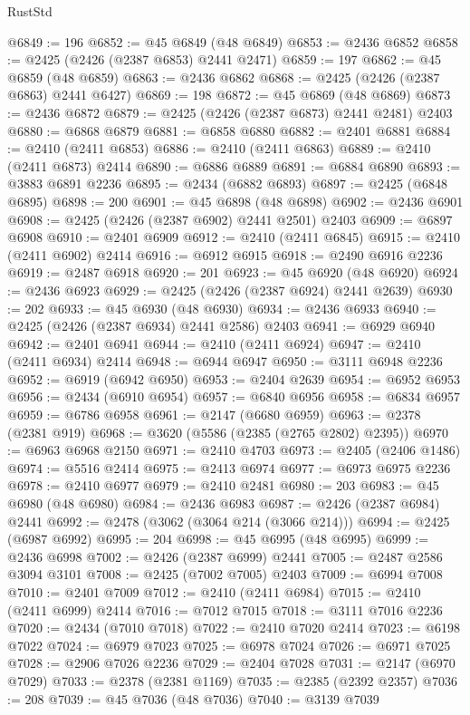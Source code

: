 \begin{lexlean}{RustStd}
\begin{coremodule}
@6849 := 196
@6852 := @45 @6849 (@48 @6849)
@6853 := @2436 @6852
@6858 := @2425 (@2426 (@2387 @6853) @2441 @2471)
@6859 := 197
@6862 := @45 @6859 (@48 @6859)
@6863 := @2436 @6862
@6868 := @2425 (@2426 (@2387 @6863) @2441 @6427)
@6869 := 198
@6872 := @45 @6869 (@48 @6869)
@6873 := @2436 @6872
@6879 := @2425 (@2426 (@2387 @6873) @2441 @2481) @2403
@6880 := @6868 @6879
@6881 := @6858 @6880
@6882 := @2401 @6881
@6884 := @2410 (@2411 @6853)
@6886 := @2410 (@2411 @6863)
@6889 := @2410 (@2411 @6873) @2414
@6890 := @6886 @6889
@6891 := @6884 @6890
@6893 := @3883 @6891 @2236
@6895 := @2434 (@6882 @6893)
@6897 := @2425 (@6848 @6895)
@6898 := 200
@6901 := @45 @6898 (@48 @6898)
@6902 := @2436 @6901
@6908 := @2425 (@2426 (@2387 @6902) @2441 @2501) @2403
@6909 := @6897 @6908
@6910 := @2401 @6909
@6912 := @2410 (@2411 @6845)
@6915 := @2410 (@2411 @6902) @2414
@6916 := @6912 @6915
@6918 := @2490 @6916 @2236
@6919 := @2487 @6918
@6920 := 201
@6923 := @45 @6920 (@48 @6920)
@6924 := @2436 @6923
@6929 := @2425 (@2426 (@2387 @6924) @2441 @2639)
@6930 := 202
@6933 := @45 @6930 (@48 @6930)
@6934 := @2436 @6933
@6940 := @2425 (@2426 (@2387 @6934) @2441 @2586) @2403
@6941 := @6929 @6940
@6942 := @2401 @6941
@6944 := @2410 (@2411 @6924)
@6947 := @2410 (@2411 @6934) @2414
@6948 := @6944 @6947
@6950 := @3111 @6948 @2236
@6952 := @6919 (@6942 @6950)
@6953 := @2404 @2639
@6954 := @6952 @6953
@6956 := @2434 (@6910 @6954)
@6957 := @6840 @6956
@6958 := @6834 @6957
@6959 := @6786 @6958
@6961 := @2147 (@6680 @6959)
@6963 := @2378 (@2381 @919)
@6968 := @3620 (@5586 (@2385 (@2765 @2802) @2395))
@6970 := @6963 @6968 @2150
@6971 := @2410 @4703
@6973 := @2405 (@2406 @1486)
@6974 := @5516 @2414
@6975 := @2413 @6974
@6977 := @6973 @6975 @2236
@6978 := @2410 @6977
@6979 := @2410 @2481
@6980 := 203
@6983 := @45 @6980 (@48 @6980)
@6984 := @2436 @6983
@6987 := @2426 (@2387 @6984) @2441
@6992 := @2478 (@3062 (@3064 @214 (@3066 @214)))
@6994 := @2425 (@6987 @6992)
@6995 := 204
@6998 := @45 @6995 (@48 @6995)
@6999 := @2436 @6998
@7002 := @2426 (@2387 @6999) @2441
@7005 := @2487 @2586 @3094 @3101
@7008 := @2425 (@7002 @7005) @2403
@7009 := @6994 @7008
@7010 := @2401 @7009
@7012 := @2410 (@2411 @6984)
@7015 := @2410 (@2411 @6999) @2414
@7016 := @7012 @7015
@7018 := @3111 @7016 @2236
@7020 := @2434 (@7010 @7018)
@7022 := @2410 @7020 @2414
@7023 := @6198 @7022
@7024 := @6979 @7023
@7025 := @6978 @7024
@7026 := @6971 @7025
@7028 := @2906 @7026 @2236
@7029 := @2404 @7028
@7031 := @2147 (@6970 @7029)
@7033 := @2378 (@2381 @1169)
@7035 := @2385 (@2392 @2357)
@7036 := 208
@7039 := @45 @7036 (@48 @7036)
@7040 := @3139 @7039

\end{coremodule}
\end{lexlean}

